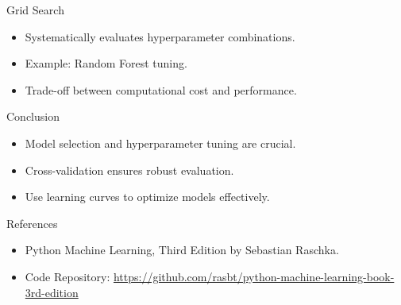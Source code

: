 \documentclass[11pt]{beamer}
\begin{document}
\begin{frame}{Grid Search}
    \begin{itemize}
        \item Systematically evaluates hyperparameter combinations.
        \item Example: Random Forest tuning.
        \item Trade-off between computational cost and performance.
    \end{itemize}
\end{frame}

\begin{frame}{Conclusion}
    \begin{itemize}
        \item Model selection and hyperparameter tuning are crucial.
        \item Cross-validation ensures robust evaluation.
        \item Use learning curves to optimize models effectively.
    \end{itemize}
\end{frame}

\begin{frame}{References}
    \begin{itemize}
        \item Python Machine Learning, Third Edition by Sebastian Raschka.
        \item Code Repository: \url{https://github.com/rasbt/python-machine-learning-book-3rd-edition}
    \end{itemize}
\end{frame}
\end{document}
